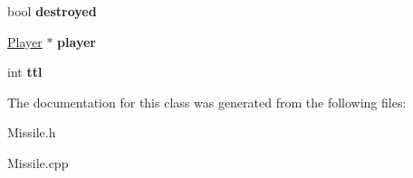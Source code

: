 \begin{DoxyCompactItemize}
\item 
bool {\bfseries destroyed}\hypertarget{class_missile_a501ac92b3928ddde1b3d7bf242a2b833}{}\label{class_missile_a501ac92b3928ddde1b3d7bf242a2b833}

\item 
\hyperlink{class_player}{Player} $\ast$ {\bfseries player}\hypertarget{class_missile_a9c5b67605eacae8bcb25b0d8ec72a173}{}\label{class_missile_a9c5b67605eacae8bcb25b0d8ec72a173}

\item 
int {\bfseries ttl}\hypertarget{class_missile_af0a7f9c0aa52d39bba311fef136f969c}{}\label{class_missile_af0a7f9c0aa52d39bba311fef136f969c}

\end{DoxyCompactItemize}


The documentation for this class was generated from the following files\+:\begin{DoxyCompactItemize}
\item 
Missile.\+h\item 
Missile.\+cpp\end{DoxyCompactItemize}
